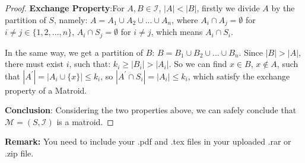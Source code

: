 \documentclass[12pt,a4paper]{article}
\theoremstyle{definition}
\begin{document}
\begin{enumerate}
\begin{proof}
        \textbf{Exchange Property}:For $A,B\in\mathcal{I}$, $|A| < |B|$, firstly we divide $A$ by the partition of $S$, namely: $A = A_1 \cup A_2 \cup... \cup A_n$, where $A_i \cap A_j = \emptyset$ for $i\neq j\in\{1, 2, ..., n\}$,
        $A_i \cap S_j = \emptyset$ for $i\neq j$, which means $A_i \cap S_i$.
        
        In the same way, we get a partition of $B$: $B = B_1 \cup B_2 \cup ... \cup B_n$. Since $|B| > |A|$, there must exist $i$, such that: $k_i \geq |B_i| > |A_i|$. So we can find $x \in B$, $x \notin A$, such that 
        $|A^{'}| = |A_i \cup \{x\}| \leq  k_i$, so $|A^{'} \cap S_i| = |A_i| \leq k_i$, which satisfy the exchange property of a Matroid.
        
        \textbf{Conclusion}: Considering the two properties above, we can safely conclude that $\mathcal{M}=(S, \mathcal{I})$ is a matroid.
    \end{proof}



\end{enumerate}

\vspace{20pt}

\textbf{Remark:} You need to include your .pdf and .tex files in your uploaded .rar or .zip file.

\end{document}
